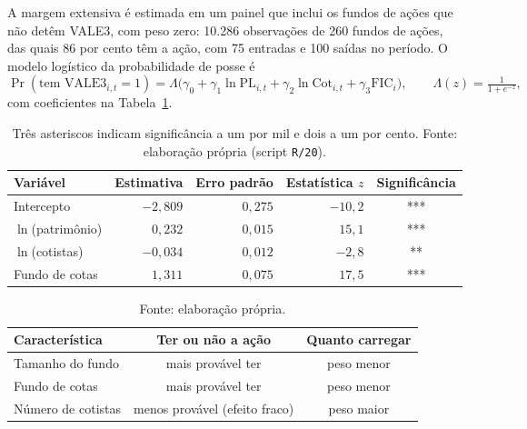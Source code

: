 \documentclass[12pt,a4paper]{article}
\begin{document}
A margem extensiva é estimada em um painel que inclui os fundos de ações que não detêm VALE3, com
peso zero: 10.286 observações de 260 fundos de ações, das quais 86 por cento têm a ação, com 75
entradas e 100 saídas no período. O modelo logístico da probabilidade de posse é
\begin{equation}
\Pr(\text{tem VALE3}_{i,t}=1) = \Lambda\!\big(\gamma_0 + \gamma_1\ln\text{PL}_{i,t}
      + \gamma_2\ln\text{Cot}_{i,t} + \gamma_3\text{FIC}_i\big),
\qquad \Lambda(z)=\tfrac{1}{1+e^{-z}},
\label{eq:posse}
\end{equation}
com coeficientes na Tabela~\ref{tab:posse}.

\begin{table}[h]\centering\small
\caption{Modelo logístico da probabilidade de o fundo deter VALE3 (painel extensivo de fundos de
ações, 10.286 observações).}
\label{tab:posse}
\begin{tabular}{@{}lrrrc@{}}
\toprule
Variável & Estimativa & Erro padrão & Estatística $z$ & Significância \\
\midrule
Intercepto        & $-2{,}809$ & $0{,}275$ & $-10{,}2$ & *** \\
$\ln$(patrimônio) & $0{,}232$  & $0{,}015$ & $15{,}1$  & *** \\
$\ln$(cotistas)   & $-0{,}034$ & $0{,}012$ & $-2{,}8$  & ** \\
Fundo de cotas    & $1{,}311$  & $0{,}075$ & $17{,}5$  & *** \\
\bottomrule
\end{tabular}
\caption*{\footnotesize Três asteriscos indicam significância a um por mil e dois a um por cento.
Fonte: elaboração própria (script \texttt{R/20}).}
\end{table}

\begin{table}[h]\centering\small
\caption{Sinais opostos entre a decisão de ter a ação e a decisão de quanto carregar.}
\label{tab:margens}
\begin{tabular}{@{}lcc@{}}
\toprule
Característica & Ter ou não a ação & Quanto carregar \\
\midrule
Tamanho do fundo   & mais provável ter & peso menor \\
Fundo de cotas     & mais provável ter & peso menor \\
Número de cotistas & menos provável (efeito fraco) & peso maior \\
\bottomrule
\end{tabular}
\caption*{\footnotesize Fonte: elaboração própria.}
\end{table}
\end{document}
